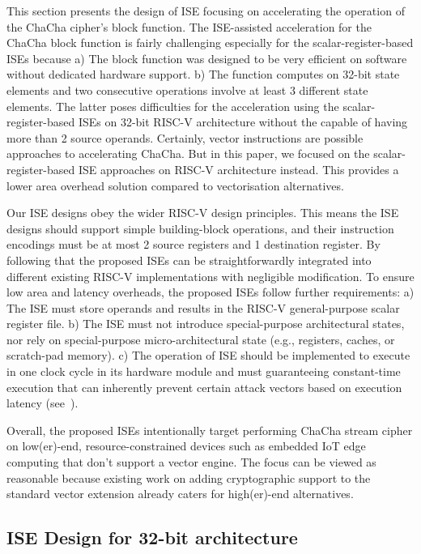 
This section presents the design of ISE focusing on accelerating the operation of the ChaCha cipher's block function. 
The ISE-assisted acceleration for the ChaCha block function is fairly challenging especially for the scalar-register-based ISEs because 
a) The block function was designed to be very efficient on software without dedicated hardware support. 
b) The function computes on 32-bit state elements and two consecutive operations involve at least 3 different state elements. 
The latter poses difficulties for the acceleration using the scalar-register-based ISEs on 32-bit RISC-V architecture without the capable of having more than 2 source operands.
Certainly, vector instructions are possible approaches to accelerating ChaCha. 
But in this paper, we focused on the scalar-register-based ISE approaches on RISC-V architecture instead. 
This provides a lower area overhead solution compared to vectorisation alternatives. 

Our ISE designs obey the wider RISC-V design principles. 
This means the ISE designs should support simple building-block operations, and their instruction encodings must be at most 2 source registers and 1 destination register. 
By following that the proposed ISEs can be straightforwardly integrated into different existing RISC-V implementations with negligible modification.
To ensure low area and latency overheads, the proposed ISEs follow further requirements: 
a) The ISE must store operands and results in the RISC-V general-purpose scalar register file. 
b) The ISE must not introduce special-purpose architectural states, nor rely on special-purpose micro-architectural state (e.g., registers, caches, or scratch-pad memory).
c) The operation of ISE should be implemented to execute in one clock cycle in its hardware module and must guaranteeing constant-time execution that can  inherently prevent certain attack vectors based on execution latency (see~\cite[Section 4]{GYC:18}).

Overall, the proposed ISEs intentionally target performing ChaCha stream cipher on low(er)-end, resource-constrained devices such as embedded IoT edge computing that don't support a vector engine. The focus can be viewed as reasonable because existing work on adding cryptographic support to the standard vector extension \cite{riscv:ext:vector:draft} already caters for high(er)-end alternatives. 

\subsection{ISE Design for 32-bit architecture}

